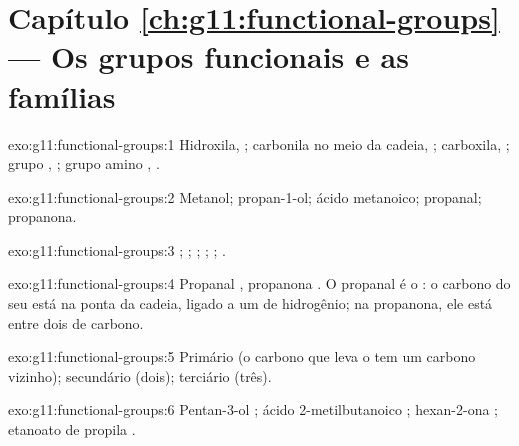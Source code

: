 \section*{Capítulo \ref{ch:g11:functional-groups} --- Os grupos funcionais e as famílias}

\begin{solution}{exo:g11:functional-groups:1}
Hidroxila, ; carbonila no meio da cadeia, ; carboxila,
; grupo , ; grupo amino , .
\end{solution}

\begin{solution}{exo:g11:functional-groups:2}
Metanol; propan-1-ol; ácido metanoico; propanal; propanona.
\end{solution}

\begin{solution}{exo:g11:functional-groups:3}
; ; ; ; ; .
\end{solution}

\begin{solution}{exo:g11:functional-groups:4}
Propanal , propanona . O propanal é o
: o carbono do seu  está na ponta da cadeia, ligado a um
 de hidrogênio; na propanona, ele está entre dois  de
carbono.
\end{solution}

\begin{solution}{exo:g11:functional-groups:5}
Primário (o carbono que leva o  tem um carbono vizinho);
secundário (dois); terciário (três).
\end{solution}

\begin{solution}{exo:g11:functional-groups:6}
Pentan-3-ol ;
ácido 2-metilbutanoico ;
hexan-2-ona ;
etanoato de propila .
\end{solution}

